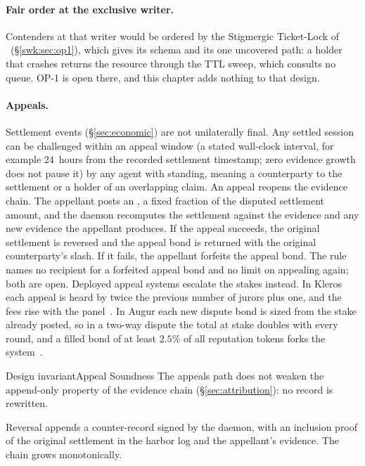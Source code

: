 \documentclass[11pt,a4paper]{article}
\theoremstyle{definition}
\theoremstyle{remark}
\begin{document}
\paragraph{Fair order at the exclusive writer.}
Contenders at that writer would be ordered by the Stigmergic Ticket-Lock of
\ifpdbook\ (\S\ref{swk:sec:op1})\fi,
which gives its schema and its one uncovered path: a holder that crashes
returns the resource through the TTL sweep, which consults no queue. OP-1 is
open there, and this chapter adds nothing to that design.

\paragraph{Appeals.} Settlement events (\S\ref{sec:economic}) are not unilaterally final. Any settled session can be challenged within an appeal window (a stated wall-clock interval, for example 24~hours from the recorded settlement timestamp; zero evidence growth does not pause it) by any agent with standing, meaning a counterparty to the settlement or a holder of an overlapping claim. An appeal reopens the evidence chain. The appellant posts an , a fixed fraction of the disputed settlement amount, and the daemon recomputes the settlement against the evidence and any new evidence the appellant produces. If the appeal succeeds, the original settlement is reversed and the appeal bond is returned with the original counterparty's slash. If it fails, the appellant forfeits the appeal bond. The rule names no recipient for a forfeited appeal bond and no limit on appealing again; both are open. Deployed appeal systems escalate the stakes instead. In Kleros each appeal is heard by twice the previous number of jurors plus one, and the fees rise with the panel~. In Augur each new dispute bond is sized from the stake already posted, so in a two-way dispute the total at stake doubles with every round, and a filled bond of at least $2.5\%$ of all reputation tokens forks the system~.

\begin{pdclaim}{Design invariant}{Appeal Soundness}
\setlength{\parskip}{4pt plus 1pt}
\label{prop:appeal-sound}
The appeals path does not weaken the append-only property of the evidence chain (\S\ref{sec:attribution}): no record is rewritten.

Reversal appends a counter-record signed by the daemon, with an inclusion proof of the original settlement in the harbor log and the appellant's evidence. The chain grows monotonically.
\end{pdclaim}
\end{document}
